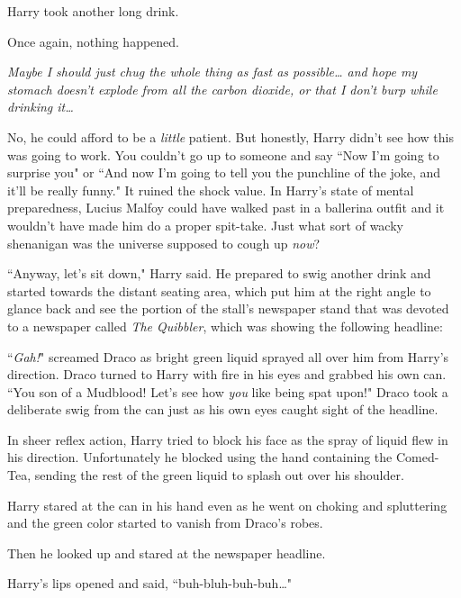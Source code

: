 Harry took another long drink.

Once again, nothing happened.

\emph{Maybe I should just chug the whole thing as fast as possible{\ldots} and hope my stomach doesn't explode from all the carbon dioxide, or that I don't burp while drinking it{\ldots}}

No, he could afford to be a \emph{little} patient. But honestly, Harry didn't see how this was going to work. You couldn't go up to someone and say ``Now I'm going to surprise you" or ``And now I'm going to tell you the punchline of the joke, and it'll be really funny." It ruined the shock value. In Harry's state of mental preparedness, Lucius Malfoy could have walked past in a ballerina outfit and it wouldn't have made him do a proper spit-take. Just what sort of wacky shenanigan was the universe supposed to cough up \emph{now}?

``Anyway, let's sit down," Harry said. He prepared to swig another drink and started towards the distant seating area, which put him at the right angle to glance back and see the portion of the stall's newspaper stand that was devoted to a newspaper called \emph{The Quibbler}, which was showing the following headline:


``\emph{Gah!}" screamed Draco as bright green liquid sprayed all over him from Harry's direction. Draco turned to Harry with fire in his eyes and grabbed his own can. ``You son of a Mudblood! Let's see how \emph{you} like being spat upon!" Draco took a deliberate swig from the can just as his own eyes caught sight of the headline.

In sheer reflex action, Harry tried to block his face as the spray of liquid flew in his direction. Unfortunately he blocked using the hand containing the Comed-Tea, sending the rest of the green liquid to splash out over his shoulder.

Harry stared at the can in his hand even as he went on choking and spluttering and the green color started to vanish from Draco's robes.

Then he looked up and stared at the newspaper headline.


Harry's lips opened and said, ``buh-bluh-buh-buh{\ldots}"

